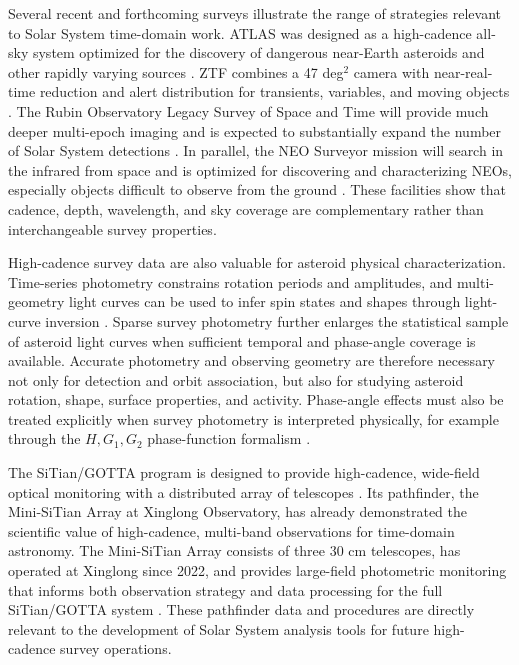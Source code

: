 \documentclass[referee]{raa}
\begin{document}
Several recent and forthcoming surveys illustrate the range of strategies relevant to Solar System time-domain work. ATLAS was designed as a high-cadence all-sky system optimized for the discovery of dangerous near-Earth asteroids and other rapidly varying sources \citep{Tonry2018}. ZTF combines a 47 deg$^2$ camera with near-real-time reduction and alert distribution for transients, variables, and moving objects \citep{Bellm2019,Patterson2019}. The Rubin Observatory Legacy Survey of Space and Time will provide much deeper multi-epoch imaging and is expected to substantially expand the number of Solar System detections \citep{Ivezic2019,Jones2018,Schwamb2023}. In parallel, the NEO Surveyor mission will search in the infrared from space and is optimized for discovering and characterizing NEOs, especially objects difficult to observe from the ground \citep{Mainzer2023}. These facilities show that cadence, depth, wavelength, and sky coverage are complementary rather than interchangeable survey properties.

High-cadence survey data are also valuable for asteroid physical characterization. Time-series photometry constrains rotation periods and amplitudes, and multi-geometry light curves can be used to infer spin states and shapes through light-curve inversion \citep{Kaasalainen2001a,Kaasalainen2001b,Warner2009}. Sparse survey photometry further enlarges the statistical sample of asteroid light curves when sufficient temporal and phase-angle coverage is available. Accurate photometry and observing geometry are therefore necessary not only for detection and orbit association, but also for studying asteroid rotation, shape, surface properties, and activity. Phase-angle effects must also be treated explicitly when survey photometry is interpreted physically, for example through the $H,G_1,G_2$ phase-function formalism \citep{Muinonen2010}.

The SiTian/GOTTA program is designed to provide high-cadence, wide-field optical monitoring with a distributed array of telescopes \citep{Liu2021}. Its pathfinder, the Mini-SiTian Array at Xinglong Observatory, has already demonstrated the scientific value of high-cadence, multi-band observations for time-domain astronomy. The Mini-SiTian Array consists of three 30 cm telescopes, has operated at Xinglong since 2022, and provides large-field photometric monitoring that informs both observation strategy and data processing for the full SiTian/GOTTA system \citep{Han2025}. These pathfinder data and procedures are directly relevant to the development of Solar System analysis tools for future high-cadence survey operations.
\end{document}
